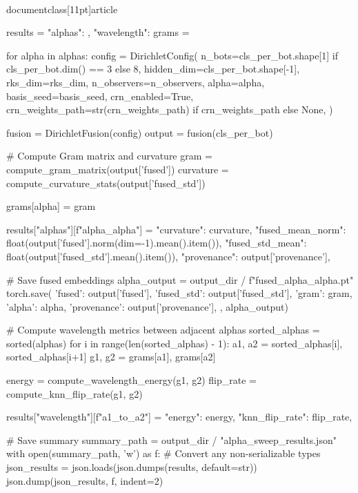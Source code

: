 \\documentclass[11pt]{article}
\begin{document}
\begin{CodeBlock}
    results = {"alphas": {}, "wavelength": {}}
    grams = {}
    
    for alpha in alphas:
        config = DirichletConfig(
            n_bots=cls_per_bot.shape[1] if cls_per_bot.dim() == 3 else 8,
            hidden_dim=cls_per_bot.shape[-1],
            rks_dim=rks_dim,
            n_observers=n_observers,
            alpha=alpha,
            basis_seed=basis_seed,
            crn_enabled=True,
            crn_weights_path=str(crn_weights_path) if crn_weights_path else None,
        )
        
        fusion = DirichletFusion(config)
        output = fusion(cls_per_bot)
        
        # Compute Gram matrix and curvature
        gram = compute_gram_matrix(output['fused'])
        curvature = compute_curvature_stats(output['fused_std'])
        
        grams[alpha] = gram
        
        results["alphas"][f"alpha_{alpha}"] = {
            "curvature": curvature,
            "fused_mean_norm": float(output['fused'].norm(dim=-1).mean().item()),
            "fused_std_mean": float(output['fused_std'].mean().item()),
            "provenance": output['provenance'],
        }
        
        # Save fused embeddings
        alpha_output = output_dir / f"fused_alpha_{alpha}.pt"
        torch.save({
            'fused': output['fused'],
            'fused_std': output['fused_std'],
            'gram': gram,
            'alpha': alpha,
            'provenance': output['provenance'],
        }, alpha_output)
    
    # Compute wavelength metrics between adjacent alphas
    sorted_alphas = sorted(alphas)
    for i in range(len(sorted_alphas) - 1):
        a1, a2 = sorted_alphas[i], sorted_alphas[i+1]
        g1, g2 = grams[a1], grams[a2]
        
        energy = compute_wavelength_energy(g1, g2)
        flip_rate = compute_knn_flip_rate(g1, g2)
        
        results["wavelength"][f"{a1}_to_{a2}"] = {
            "energy": energy,
            "knn_flip_rate": flip_rate,
        }
    
    # Save summary
    summary_path = output_dir / "alpha_sweep_results.json"
    with open(summary_path, 'w') as f:
        # Convert any non-serializable types
        json_results = json.loads(json.dumps(results, default=str))
        json.dump(json_results, f, indent=2)
    

\end{CodeBlock}
\end{document}

